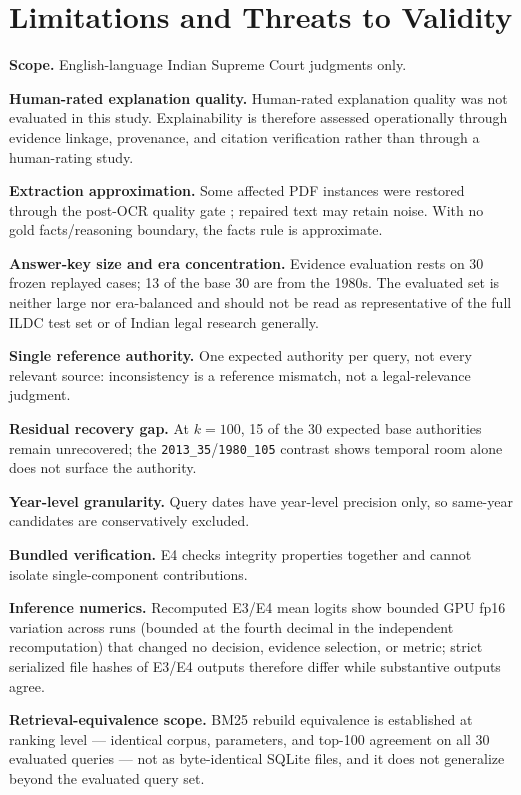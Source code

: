 \documentclass[conference]{IEEEtran}
\begin{document}
\section{Limitations and Threats to Validity}
\label{sec:limits}

\textbf{Scope.} English-language Indian Supreme Court judgments
only.

\textbf{Human-rated explanation quality.} Human-rated explanation quality was not evaluated in this study. Explainability is therefore assessed operationally through evidence linkage, provenance, and citation verification rather than through a human-rating study.

\textbf{Extraction approximation.} Some affected PDF instances were restored through the post-OCR
quality gate \cite{smith2007}; repaired text may retain noise. With
no gold facts/reasoning boundary, the facts rule is approximate.

\textbf{Answer-key size and era concentration.} Evidence evaluation rests on
30 frozen replayed cases; 13 of the base 30 are from
the 1980s. The evaluated set is neither large nor era-balanced and should not
be read as representative of the full ILDC test set or of
Indian legal research generally.

\textbf{Single reference authority.} One expected authority per
query, not every relevant source: inconsistency is a
reference mismatch, not a legal-relevance judgment.

\textbf{Residual recovery gap.} At $k{=}100$, 15 of the 30 expected base authorities
remain unrecovered; the \texttt{2013\_35}/\texttt{1980\_105} contrast shows
temporal room alone does not surface the authority.

\textbf{Year-level granularity.} Query dates have
year-level precision only, so same-year candidates
are conservatively excluded.

\textbf{Bundled verification.} E4 checks integrity properties together
and cannot isolate single-component contributions.

\textbf{Inference numerics.} Recomputed E3/E4 mean logits show bounded GPU
fp16 variation across runs (bounded at the fourth decimal in the
independent recomputation) that changed no decision, evidence selection, or
metric; strict serialized file hashes of E3/E4 outputs therefore differ while
substantive outputs agree.

\textbf{Retrieval-equivalence scope.} BM25 rebuild equivalence is established
at ranking level --- identical corpus, parameters, and top-100 agreement on
all 30 evaluated queries --- not as byte-identical SQLite files, and it does
not generalize beyond the evaluated query set.
\end{document}
